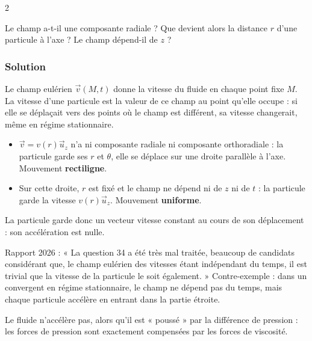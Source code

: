 \documentclass[11pt,a4paper]{article}
\providecommand{\tightlist}{\setlength{\itemsep}{0pt}\setlength{\parskip}{0pt}}
\begin{document}
\begin{indication}{2}

Le champ a-t-il une composante radiale ? Que devient alors la distance \(r\) d'une particule à l'axe ? Le champ dépend-il de \(z\) ?

\end{indication}

\hypertarget{solution-33}{%
\subsubsection{Solution}\label{solution-33}}

Le champ eulérien \(\vec v(M,t)\) donne la vitesse du fluide en chaque point fixe \(M\). La vitesse d'une particule est la valeur de ce champ au point qu'elle occupe : si elle se déplaçait vers des points où le champ est différent, sa vitesse changerait, même en régime stationnaire.

\begin{itemize}
\tightlist
\item
  \(\vec v=v(r)\vec u_z\) n'a ni composante radiale ni composante orthoradiale : la particule garde ses \(r\) et \(\theta\), elle se déplace sur une droite parallèle à l'axe. Mouvement \textbf{rectiligne}.
\item
  Sur cette droite, \(r\) est fixé et le champ ne dépend ni de \(z\) ni de \(t\) : la particule garde la vitesse \(v(r)\vec u_z\). Mouvement \textbf{uniforme}.
\end{itemize}

La particule garde donc un vecteur vitesse constant au cours de son déplacement : son accélération est nulle.

\begin{piege}

Rapport 2026 : « La question 34 a été très mal traitée, beaucoup de candidats considérant que, le champ eulérien des vitesses étant indépendant du temps, il est trivial que la vitesse de la particule le soit également. » Contre-exemple : dans un convergent en régime stationnaire, le champ ne dépend pas du temps, mais chaque particule accélère en entrant dans la partie étroite.

\end{piege}

\begin{piege}

Le fluide n'accélère pas, alors qu'il est « poussé » par la différence de pression : les forces de pression sont exactement compensées par les forces de viscosité.

\end{piege}
\end{document}
